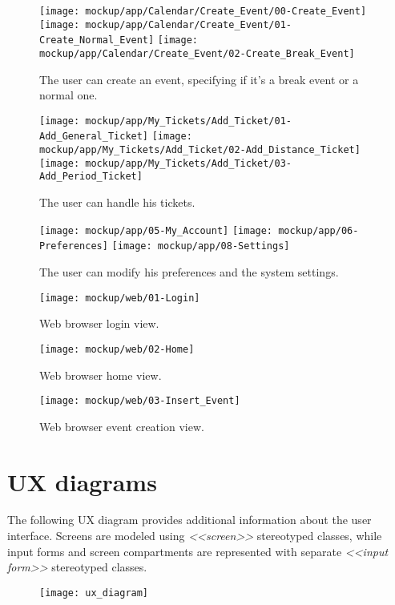 	\begin{figure}[H]
		\texttt{[image: mockup/app/Calendar/Create\_Event/00-Create\_Event]}
		\hspace{.3cm}
		\texttt{[image: mockup/app/Calendar/Create\_Event/01-Create\_Normal\_Event]}
		\hspace{.3cm}
		\texttt{[image: mockup/app/Calendar/Create\_Event/02-Create\_Break\_Event]}
		\centering 
		\caption{The user can create an event, specifying if it's a break event or a normal one.}
	\end{figure}
	
	\begin{figure}[H]
		\texttt{[image: mockup/app/My\_Tickets/Add\_Ticket/01-Add\_General\_Ticket]}
		\hspace{.3cm}
		\texttt{[image: mockup/app/My\_Tickets/Add\_Ticket/02-Add\_Distance\_Ticket]}
		\hspace{.3cm}
		\texttt{[image: mockup/app/My\_Tickets/Add\_Ticket/03-Add\_Period\_Ticket]}
		\centering 
		\caption{The user can handle his tickets.}
	\end{figure}
	
	\begin{figure}[H]
		\texttt{[image: mockup/app/05-My\_Account]}
		\hspace{.3cm}
		\texttt{[image: mockup/app/06-Preferences]}
		\hspace{.3cm}
		\texttt{[image: mockup/app/08-Settings]}
		\centering 
		\caption{The user can modify his preferences and the system settings.}
	\end{figure}
	
	\begin{figure}[H]
		\texttt{[image: mockup/web/01-Login]}
		\centering
		\caption{Web browser login view.}
	\end{figure}
	\begin{figure}[H]
		\texttt{[image: mockup/web/02-Home]}
		\centering
		\caption{Web browser home view.}
	\end{figure}
	\begin{figure}[H]
		\texttt{[image: mockup/web/03-Insert\_Event]}
		\centering
		\caption{Web browser event creation view.}
	\end{figure}

\section{UX diagrams}
\label{subsect:UX diagrams}
	The following UX diagram provides additional information about the user interface.
Screens are modeled using \textit{\textless\textless screen\textgreater\textgreater} stereotyped classes, while input forms and screen compartments are represented with separate \textit{\textless\textless input form\textgreater\textgreater} stereotyped classes.
	\begin{figure}[H]
		\texttt{[image: ux\_diagram]}
		\centering
	\end{figure}
	
